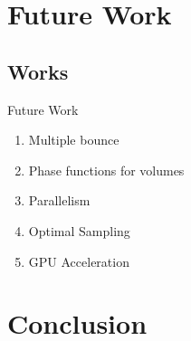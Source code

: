 \documentclass[10pt,compress,professionalfont]{beamer}
\begin{document}
\section{Future Work}
\subsection{Works}
\begin{frame}{Future Work}

    \begin{enumerate}
        \item Multiple bounce
        \item Phase functions for volumes
        \item Parallelism
        \item Optimal Sampling
        \item GPU Acceleration
    \end{enumerate}

\end{frame}




\section{Conclusion}
\end{document}
